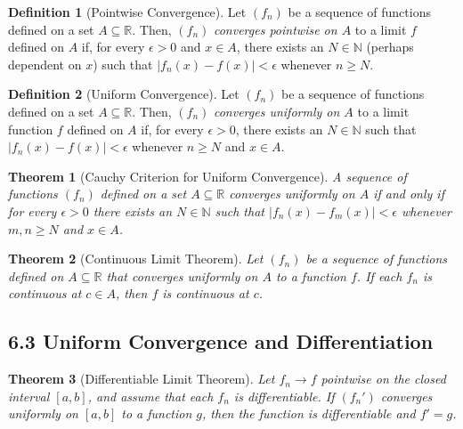 \documentclass{amsart}
\newtheorem*{theorem}{Theorem}
\theoremstyle{definition}
\newtheorem*{definition}{Definition}
\newcommand{\N}{\mathbb{N}}
\newcommand{\R}{\mathbb{R}}
\newcommand{\abs}[1]{|#1|}
\begin{document}
\begin{definition}[Pointwise Convergence]
  Let $(f_n)$ be a sequence of functions defined on a set $A \subseteq \R$.
  Then, $(f_n)$ \emph{converges pointwise on $A$} to a limit $f$ defined on $A$
  if, for every $\epsilon > 0$ and $x \in A$, there exists an $N \in \N$
  (perhaps dependent on $x$) such that $\abs{f_n(x) - f(x)} < \epsilon$ whenever
  $n \ge N$.
\end{definition}

\begin{definition}[Uniform Convergence]
  Let $(f_n)$ be a sequence of functions defined on a set $A \subseteq \R$.
  Then, $(f_n)$ \emph{converges uniformly on $A$} to a limit function $f$
  defined on $A$ if, for every $\epsilon > 0$, there exists an $N \in \N$ such
  that $\abs{f_n(x) - f(x)} < \epsilon$ whenever $n \ge N$ and $x \in A$.
\end{definition}

\begin{theorem}[Cauchy Criterion for Uniform Convergence]
  A sequence of functions $(f_n)$ defined on a set $A \subseteq \R$ converges
  uniformly on $A$ if and only if for every $\epsilon > 0$ there exists an $N
  \in \N$ such that $\abs{f_n(x) - f_m(x)} < \epsilon$ whenever $m, n \ge N$ and
  $x \in A$.
\end{theorem}

\begin{theorem}[Continuous Limit Theorem]
  Let $(f_n)$ be a sequence of functions defined on $A \subseteq \R$ that
  converges uniformly on $A$ to a function $f$. If each $f_n$ is continuous at
  $c \in A$, then $f$ is continuous at $c$.
\end{theorem}

\subsection*{6.3 Uniform Convergence and Differentiation}

\begin{theorem}[Differentiable Limit Theorem]
  Let $f_n \to f$ pointwise on the closed interval $[a, b]$, and assume that
  each $f_n$ is differentiable. If $(f_n')$ converges uniformly on $[a, b]$ to a
  function $g$, then the function is differentiable and $f' = g$.
\end{theorem}
\end{document}
